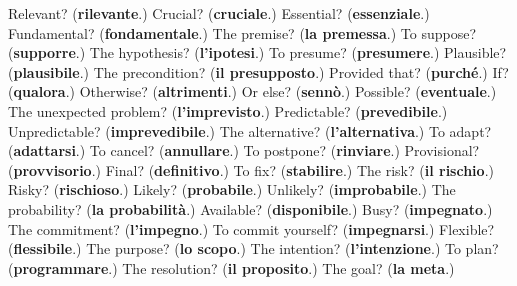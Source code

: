 \begin{tcolorbox}[breakable,colback=teal!4,colframe=teal!35!black,title={Before you move on}]
Relevant? (\textbf{rilevante}.) Crucial? (\textbf{cruciale}.) Essential? (\textbf{essenziale}.) Fundamental? (\textbf{fondamentale}.) The premise? (\textbf{la premessa}.) To suppose? (\textbf{supporre}.) The hypothesis? (\textbf{l'ipotesi}.) To presume? (\textbf{presumere}.) Plausible? (\textbf{plausibile}.) The precondition? (\textbf{il presupposto}.) Provided that? (\textbf{purché}.) If? (\textbf{qualora}.) Otherwise? (\textbf{altrimenti}.) Or else? (\textbf{sennò}.) Possible? (\textbf{eventuale}.) The unexpected problem? (\textbf{l'imprevisto}.) Predictable? (\textbf{prevedibile}.) Unpredictable? (\textbf{imprevedibile}.) The alternative? (\textbf{l'alternativa}.) To adapt? (\textbf{adattarsi}.) To cancel? (\textbf{annullare}.) To postpone? (\textbf{rinviare}.) Provisional? (\textbf{provvisorio}.) Final? (\textbf{definitivo}.) To fix? (\textbf{stabilire}.) The risk? (\textbf{il rischio}.) Risky? (\textbf{rischioso}.) Likely? (\textbf{probabile}.) Unlikely? (\textbf{improbabile}.) The probability? (\textbf{la probabilità}.) Available? (\textbf{disponibile}.) Busy? (\textbf{impegnato}.) The commitment? (\textbf{l'impegno}.) To commit yourself? (\textbf{impegnarsi}.) Flexible? (\textbf{flessibile}.) The purpose? (\textbf{lo scopo}.) The intention? (\textbf{l'intenzione}.) To plan? (\textbf{programmare}.) The resolution? (\textbf{il proposito}.) The goal? (\textbf{la meta}.)
\end{tcolorbox}
